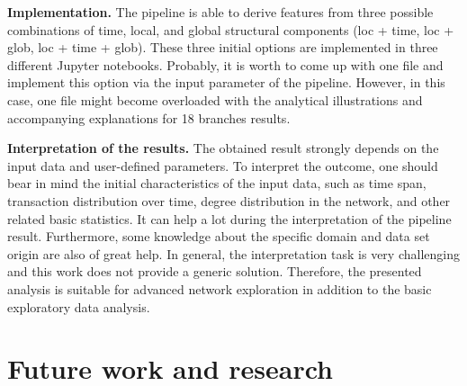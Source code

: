 \textbf{Implementation.}
The pipeline is able to derive features from three possible combinations of time, local, and global structural components (loc + time, loc + glob, loc + time + glob). These three initial options are implemented in three different Jupyter notebooks. Probably, it is worth to come up with one file and implement this option via the input parameter of the pipeline. However, in this case, one file might become overloaded with the analytical illustrations and accompanying explanations for 18 branches results.

\textbf{Interpretation of the results.}
The obtained result strongly depends on the input data and user-defined parameters. To interpret the outcome, one should bear in mind the initial characteristics of the input data, such as time span, transaction distribution over time, degree distribution in the network, and other related basic statistics. It can help a lot during the interpretation of the pipeline result. Furthermore, some knowledge about the specific domain and data set origin are also of great help. In general, the interpretation task is very challenging and this work does not provide a generic solution. Therefore, the presented analysis is suitable for advanced network exploration in addition to the basic exploratory data analysis.

\section{Future work and research}

